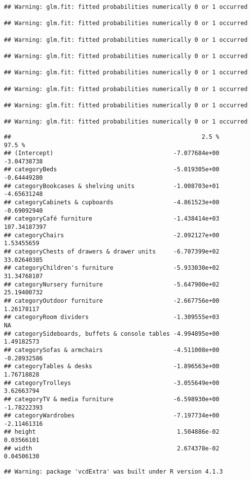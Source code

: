 \documentclass[
]{article}
\begin{document}
\begin{verbatim}
## Warning: glm.fit: fitted probabilities numerically 0 or 1 occurred

## Warning: glm.fit: fitted probabilities numerically 0 or 1 occurred

## Warning: glm.fit: fitted probabilities numerically 0 or 1 occurred

## Warning: glm.fit: fitted probabilities numerically 0 or 1 occurred

## Warning: glm.fit: fitted probabilities numerically 0 or 1 occurred

## Warning: glm.fit: fitted probabilities numerically 0 or 1 occurred

## Warning: glm.fit: fitted probabilities numerically 0 or 1 occurred

## Warning: glm.fit: fitted probabilities numerically 0 or 1 occurred
\end{verbatim}

\begin{verbatim}
##                                                      2.5 %       97.5 %
## (Intercept)                                  -7.077684e+00  -3.04738738
## categoryBeds                                 -5.019305e+00  -0.64449280
## categoryBookcases & shelving units           -1.008703e+01  -4.65631248
## categoryCabinets & cupboards                 -4.861523e+00  -0.69092940
## categoryCafé furniture                       -1.438414e+03 107.34187397
## categoryChairs                               -2.092127e+00   1.53455659
## categoryChests of drawers & drawer units     -6.707399e+02  33.02640385
## categoryChildren's furniture                 -5.933030e+02  31.34768107
## categoryNursery furniture                    -5.647900e+02  25.19400732
## categoryOutdoor furniture                    -2.667756e+00   1.26178117
## categoryRoom dividers                        -1.309555e+03           NA
## categorySideboards, buffets & console tables -4.994895e+00   1.49182573
## categorySofas & armchairs                    -4.511008e+00  -0.28932586
## categoryTables & desks                       -1.896563e+00   1.76718828
## categoryTrolleys                             -3.055649e+00   3.62663794
## categoryTV & media furniture                 -6.598930e+00  -1.78222393
## categoryWardrobes                            -7.197734e+00  -2.11461316
## height                                        1.504886e-02   0.03566101
## width                                         2.674378e-02   0.04506130
\end{verbatim}

\begin{verbatim}
## Warning: package 'vcdExtra' was built under R version 4.1.3
\end{verbatim}
\end{document}
